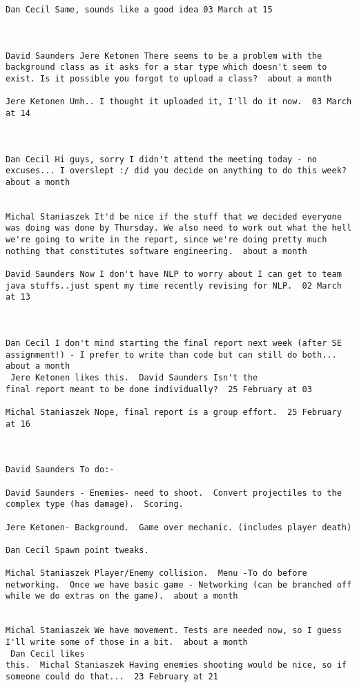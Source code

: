 \documentclass[10pt]{report}
\begin{document}
\begin{verbatim}
Dan Cecil Same, sounds like a good idea 03 March at 15



David Saunders Jere Ketonen There seems to be a problem with the
background class as it asks for a star type which doesn't seem to
exist. Is it possible you forgot to upload a class?  about a month 

Jere Ketonen Umh.. I thought it uploaded it, I'll do it now.  03 March
at 14



Dan Cecil Hi guys, sorry I didn't attend the meeting today - no
excuses... I overslept :/ did you decide on anything to do this week?
about a month 


Michal Staniaszek It'd be nice if the stuff that we decided everyone
was doing was done by Thursday. We also need to work out what the hell
we're going to write in the report, since we're doing pretty much
nothing that constitutes software engineering.  about a month 

David Saunders Now I don't have NLP to worry about I can get to team
java stuffs..just spent my time recently revising for NLP.  02 March
at 13



Dan Cecil I don't mind starting the final report next week (after SE
assignment!) - I prefer to write than code but can still do both...
about a month 
 Jere Ketonen likes this.  David Saunders Isn't the
final report meant to be done individually?  25 February at 03

Michal Staniaszek Nope, final report is a group effort.  25 February
at 16



David Saunders To do:-

David Saunders - Enemies- need to shoot.  Convert projectiles to the
complex type (has damage).  Scoring.

Jere Ketonen- Background.  Game over mechanic. (includes player death)

Dan Cecil Spawn point tweaks.

Michal Staniaszek Player/Enemy collision.  Menu -To do before
networking.  Once we have basic game - Networking (can be branched off
while we do extras on the game).  about a month 


Michal Staniaszek We have movement. Tests are needed now, so I guess
I'll write some of those in a bit.  about a month 
 Dan Cecil likes
this.  Michal Staniaszek Having enemies shooting would be nice, so if
someone could do that...  23 February at 21


\end{verbatim}
\end{document}
